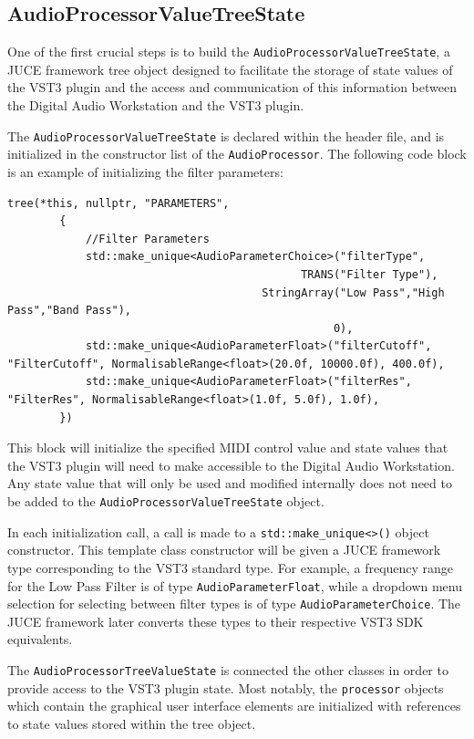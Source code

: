 \documentclass[a4paper,12pt]{report}
\begin{document}
\subsection{AudioProcessorValueTreeState}
\label{subsec:apvt}
One of the first crucial steps is to build the \texttt{AudioProcessorValueTreeState}, a JUCE framework tree object designed to facilitate the storage of state values of the VST3 plugin and the access and communication of this information between the Digital Audio Workstation and the VST3 plugin.

The \texttt{AudioProcessorValueTreeState} is declared within the header file, and is initialized in the constructor list of the \texttt{AudioProcessor}. The following code block is an example of initializing the filter parameters:

\begin{lstlisting}[caption={Initializing Filter Parameters},label={code:initfilterparam},captionpos=b]
tree(*this, nullptr, "PARAMETERS",
        {   
            //Filter Parameters
            std::make_unique<AudioParameterChoice>("filterType",
                                             TRANS("Filter Type"),
                                       StringArray("Low Pass","High Pass","Band Pass"),
                                                  0),
            std::make_unique<AudioParameterFloat>("filterCutoff", "FilterCutoff", NormalisableRange<float>(20.0f, 10000.0f), 400.0f),
            std::make_unique<AudioParameterFloat>("filterRes", "FilterRes", NormalisableRange<float>(1.0f, 5.0f), 1.0f),
        })
\end{lstlisting}

This block will initialize the specified MIDI control value and state values that the VST3 plugin will need to make accessible to the Digital Audio Workstation. Any state value that will only be used and modified internally does not need to be added to the \texttt{AudioProcessorValueTreeState} object.

In each initialization call, a call is made to a \texttt{std::make\_unique<>()} object constructor. This template class constructor will be given a JUCE framework type corresponding to the VST3 standard type. For example, a frequency range for the Low Pass Filter is of type \texttt{AudioParameterFloat}, while a dropdown menu selection for selecting between filter types is of type \texttt{AudioParameterChoice}. The JUCE framework later converts these types to their respective VST3 SDK equivalents.

The \texttt{AudioProcessorTreeValueState} is connected the other classes in order to provide access to the VST3 plugin state. Most notably, the \texttt{processor} objects which contain the graphical user interface elements are initialized with references to state values stored within the tree object.
\end{document}
